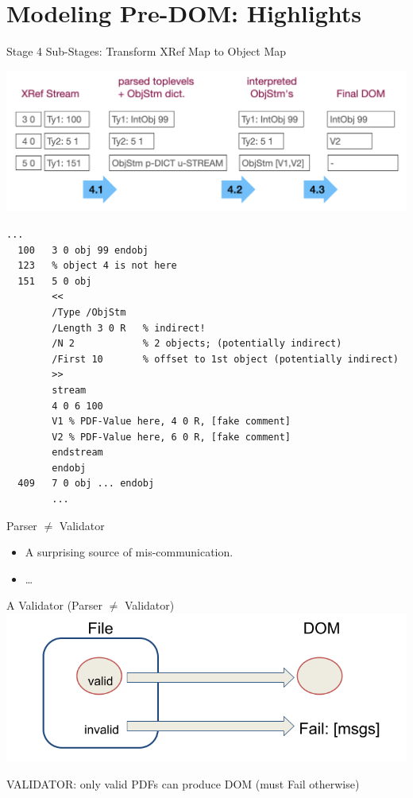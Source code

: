 \documentclass[t,10pt,xcolor={dvipsnames}]{beamer}
\begin{document}
\section{Modeling Pre-DOM: Highlights}
\label{sec:org9a1651f}
\begin{frame}[label={sec:org9913ba2},fragile]{Stage 4 Sub-Stages: Transform XRef Map to Object Map}
\vspace*{-15pt}
\begin{center}
\includegraphics[width=0.75\linewidth]{images/diagram1/cropped-diagram1.001.png}
\end{center}
\vspace*{-15pt}
\begin{lstlisting}[style=pdfcode]
        ... 
  100   3 0 obj 99 endobj
  123   % object 4 is not here
  151   5 0 obj
        <<
        /Type /ObjStm
        /Length 3 0 R   % indirect!
        /N 2            % 2 objects; (potentially indirect)
        /First 10       % offset to 1st object (potentially indirect)
        >>
        stream
        4 0 6 100
        V1 % PDF-Value here, 4 0 R, [fake comment] 
        V2 % PDF-Value here, 6 0 R, [fake comment]
        endstream
        endobj
  409   7 0 obj ... endobj
        ...
\end{lstlisting}
\end{frame}

\begin{frame}[label={sec:orga668446}]{Parser \(\neq\) Validator}
\begin{itemize}
\item A surprising source of mis-communication.
\item \ldots{}
\end{itemize}
\end{frame}
\begin{frame}[label={sec:orga72adad}]{A Validator (Parser \(\neq\) Validator)}
\vspace{10pt}
\includegraphics[width=0.80\linewidth]{images/pNEQv-1.png}
\vfill

VALIDATOR: only valid PDFs can produce DOM (must Fail otherwise)
\end{frame}
\end{document}
